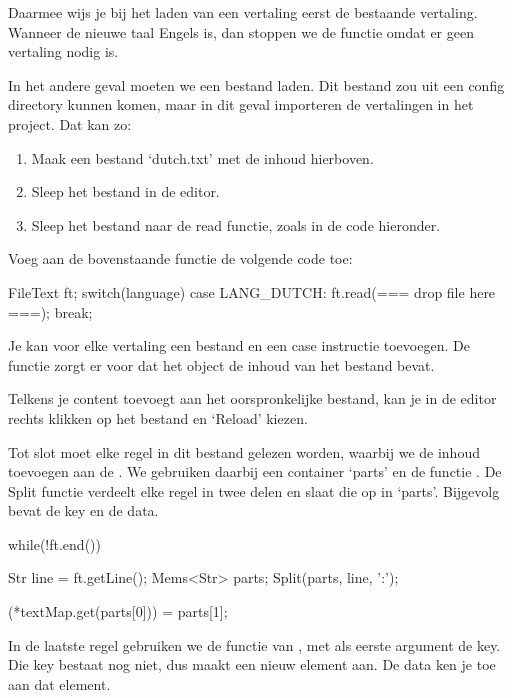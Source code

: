 Daarmee wijs je bij het laden van een vertaling eerst de bestaande vertaling. Wanneer de nieuwe taal Engels is, dan stoppen we de functie omdat er geen vertaling nodig is.

In het andere geval moeten we een bestand laden. Dit bestand zou uit een config directory kunnen komen, maar in dit geval importeren de vertalingen in het project. Dat kan zo:

\begin{enumerate}
	\item Maak een bestand `dutch.txt' met de inhoud hierboven.
	\item Sleep het bestand in de editor.
	\item Sleep het bestand naar de read functie, zoals in de code hieronder.
\end{enumerate}

Voeg aan de bovenstaande functie de volgende code toe:
\begin{code}
FileText ft;
switch(language) {
	case LANG_DUTCH:
	{ 
	    ft.read(=== drop file here ===);
	    break; 
	}
}
\end{code}

Je kan voor elke vertaling een bestand en een case instructie toevoegen. De functie  zorgt er voor dat het object  de inhoud van het bestand bevat.

\begin{note}
Telkens je content toevoegt aan het oorspronkelijke bestand, kan je in de editor rechts klikken op het bestand en `Reload' kiezen.
\end{note}

Tot slot moet elke regel in dit bestand gelezen worden, waarbij we de inhoud toevoegen aan de . We gebruiken daarbij een container `parts' en de functie . De Split functie verdeelt elke regel in twee delen en slaat die op in `parts'. Bijgevolg bevat  de key en  de data.

\begin{code}
while(!ft.end())
{
 	Str line = ft.getLine();
 	Mems<Str> parts;
 	Split(parts, line, ':');
 
	(*textMap.get(parts[0])) = parts[1];
}
\end{code}

In de laatste regel gebruiken we de  functie van , met als eerste argument de key. Die key bestaat nog niet, dus  maakt een nieuw element aan. De data ken je toe aan dat element.

